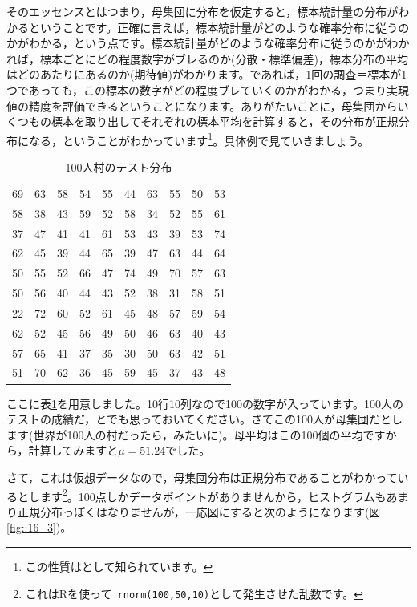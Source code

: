 \documentclass{ltjsbook}
\begin{document}
そのエッセンスとはつまり，母集団に分布を仮定すると，標本統計量の分布がわかるということです。正確に言えば，標本統計量がどのような確率分布に従うのかがわかる，という点です。標本統計量がどのような確率分布に従うのかがわかれば，標本ごとにどの程度数字がブレるのか(分散・標準偏差)，標本分布の平均はどのあたりにあるのか(期待値)がわかります。であれば，1回の調査＝標本が1つであっても，この標本の数字がどの程度ブレていくのかがわかる，つまり実現値の精度を評価できるということになります。ありがたいことに，母集団からいくつもの標本を取り出してそれぞれの標本平均を計算すると，その分布が正規分布になる，ということがわかっています\footnote{この性質はとして知られています。}。具体例で見ていきましょう。

\begin{table}[ht]
	\centering
	\caption{100人村のテスト分布}
	\begin{tabular}{rrrrrrrrrr}
		\hline
		69 & 63 & 58 & 54 & 55 & 44 & 63 & 55 & 50 & 53 \\
		58 & 38 & 43 & 59 & 52 & 58 & 34 & 52 & 55 & 61 \\
		37 & 47 & 41 & 41 & 61 & 53 & 43 & 39 & 53 & 74 \\
		62 & 45 & 39 & 44 & 65 & 39 & 47 & 63 & 44 & 64 \\
		50 & 55 & 52 & 66 & 47 & 74 & 49 & 70 & 57 & 63 \\
		50 & 56 & 40 & 44 & 43 & 52 & 38 & 31 & 58 & 51 \\
		22 & 72 & 60 & 52 & 61 & 45 & 48 & 57 & 59 & 54 \\
		62 & 52 & 45 & 56 & 49 & 50 & 46 & 63 & 40 & 43 \\
		57 & 65 & 41 & 37 & 35 & 30 & 50 & 63 & 42 & 51 \\
		51 & 70 & 62 & 36 & 45 & 59 & 45 & 37 & 43 & 48 \\
		\hline
	\end{tabular}
	\label{tbl::16_01}
\end{table}

ここに表\ref{tbl::16_01}を用意しました。10行10列なので100の数字が入っています。100人のテストの成績だ，とでも思っておいてください。さてこの100人が母集団だとします(世界が100人の村だったら，みたいに)。母平均はこの100個の平均ですから，計算してみますと$\mu=51.24$でした。

さて，これは仮想データなので，母集団分布は正規分布であることがわかっているとします\footnote{これはRを使って\texttt{ rnorm(100,50,10)}として発生させた乱数です。}。100点しかデータポイントがありませんから，ヒストグラムもあまり正規分布っぽくはなりませんが，一応図にすると次のようになります(図\ref{fig::16_3})。
\end{document}
